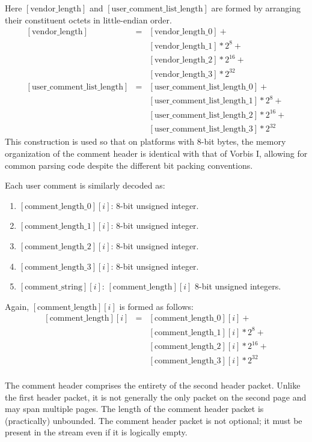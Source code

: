 \documentclass[11pt,letterpaper]{article}
\newcommand{\bitvar}[1]{\ensuremath{\left[\mathrm{#1}\right]}}
\begin{document}
Here \bitvar{vendor\_length} and \bitvar{user\_comment\_list\_length} are
 formed by arranging their constituent octets in little-endian order.
\begin{eqnarray*}
\bitvar{vendor\_length} & = &
\bitvar{vendor\_length\_0} + \\
&& \bitvar{vendor\_length\_1}*2^8 + \\
&& \bitvar{vendor\_length\_2}*2^{16} + \\
&& \bitvar{vendor\_length\_3}*2^{32} \\
\bitvar{user\_comment\_list\_length} & = &
\bitvar{user\_comment\_list\_length\_0} + \\
&& \bitvar{user\_comment\_list\_length\_1}*2^8 + \\
&& \bitvar{user\_comment\_list\_length\_2}*2^{16} + \\
&& \bitvar{user\_comment\_list\_length\_3}*2^{32}
\end{eqnarray*}
This construction is used so that on platforms with 8-bit bytes, the memory
 organization of the comment header is identical with that of Vorbis I,
 allowing for common parsing code despite the different bit packing
 conventions.

Each user comment is similarly decoded as:
\begin{enumerate}
\item{$\bitvar{comment\_length\_0}[i]$:} 8-bit unsigned integer.
\item{$\bitvar{comment\_length\_1}[i]$:} 8-bit unsigned integer.
\item{$\bitvar{comment\_length\_2}[i]$:} 8-bit unsigned integer.
\item{$\bitvar{comment\_length\_3}[i]$:} 8-bit unsigned integer.
\item{$\bitvar{comment\_string}[i]$:} $\bitvar{comment\_length}[i]$ 8-bit
 unsigned integers.
\end{enumerate}

Again, $\bitvar{comment\_length}[i]$ is formed as follows:
\begin{eqnarray*}
\bitvar{comment\_length}[i] & = &
\bitvar{comment\_length\_0}[i] + \\
&& \bitvar{comment\_length\_1}[i]*2^8 + \\
&& \bitvar{comment\_length\_2}[i]*2^{16} + \\
&& \bitvar{comment\_length\_3}[i]*2^{32} \\
\end{eqnarray*}

The comment header comprises the entirety of the second header packet.
Unlike the first header packet, it is not generally the only packet on the
 second page and may span multiple pages.
The length of the comment header packet is (practically) unbounded.
The comment header packet is not optional; it must be present in the stream
 even if it is logically empty.
\end{document}

